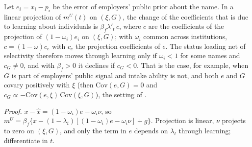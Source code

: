 \begin{thycor}\label{cor:thy-decay}
Let $e_i=x_i-p_i$ be the error of employers' public prior about the name. In a linear projection of $m^U(t)$ on
$(\xi,G)$, the change of the coefficients that is due to learning about individuals is $\beta_f\lambda'_t\,c$, where
$c$ are the coefficients of the projection of $(1-\omega_i)e_i$ on $(\xi,G)$; with $\omega_i$ common across
institutions, $c=(1-\omega)c_e$ with $c_e$ the projection coefficients of $e$. The status loading net of selectivity
therefore moves through learning only if $\omega_i<1$ for some names and $c_G\neq0$, and with $\beta_f>0$ it declines
if $c_G<0$. That is the case, for example, when $G$ is part of employers' public signal and intake ability is not, and
both $e$ and $G$ covary positively with $\xi$ (then $\mathrm{Cov}(e,G)=0$ and
$c_G\propto-\mathrm{Cov}(e,\xi)\,\mathrm{Cov}(\xi,G)$), the setting of \citet{altonji2001employer}.
\end{thycor}

\emph{Proof.} $x-\hat x=(1-\omega_i)e-\omega_i\nu$, so
$m^U=\beta_f\{x-(1-\lambda_t)[(1-\omega_i)e-\omega_i\nu]+g\}$. Projection is linear, $\nu$ projects to zero on
$(\xi,G)$, and only the term in $e$ depends on $\lambda_t$ through learning; differentiate in $t$. \thyqed

